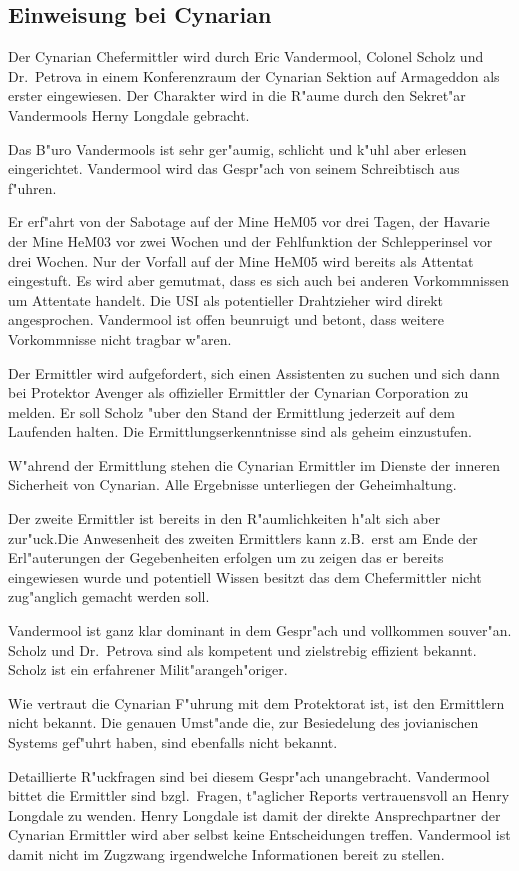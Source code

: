 \subsection{Einweisung bei Cynarian}

Der Cynarian Chefermittler wird durch Eric Vandermool, Colonel Scholz und Dr.~Petrova in einem Konferenzraum der Cynarian Sektion auf Armageddon als erster eingewiesen. Der Charakter wird in die R"aume durch den Sekret"ar Vandermools Herny Longdale gebracht.

Das B"uro Vandermools ist sehr ger"aumig, schlicht und k"uhl aber erlesen eingerichtet. Vandermool wird das Gespr"ach von seinem Schreibtisch aus f"uhren.

Er erf"ahrt von der Sabotage auf der Mine HeM05 vor drei Tagen, der Havarie der Mine HeM03 vor zwei Wochen und der Fehlfunktion der Schlepperinsel vor drei Wochen. Nur der Vorfall auf der Mine HeM05 wird bereits als Attentat eingestuft. Es wird aber gemutma\3t, dass es sich auch bei anderen Vorkommnissen um Attentate handelt. Die USI als potentieller Drahtzieher wird direkt angesprochen. Vandermool ist offen beunruigt und betont, dass weitere Vorkommnisse nicht tragbar w"aren.

Der Ermittler wird aufgefordert, sich einen Assistenten zu suchen und sich dann bei Protektor Avenger als offizieller Ermittler der Cynarian Corporation zu melden. Er soll Scholz "uber den Stand der Ermittlung jederzeit auf dem Laufenden halten. Die Ermittlungserkenntnisse sind als geheim einzustufen.

W"ahrend der Ermittlung stehen die Cynarian Ermittler im Dienste der inneren Sicherheit von Cynarian. Alle Ergebnisse unterliegen der Geheimhaltung.

\begin{remarks}
	Der zweite Ermittler ist bereits in den R"aumlichkeiten h"alt sich aber zur"uck.Die Anwesenheit des zweiten Ermittlers kann z.B.~erst am Ende der Erl"auterungen der Gegebenheiten erfolgen um zu zeigen das er bereits eingewiesen wurde und potentiell Wissen besitzt das dem Chefermittler nicht zug"anglich gemacht werden soll.
	
	Vandermool ist ganz klar dominant in dem Gespr"ach und vollkommen souver"an. Scholz und Dr.~Petrova sind als kompetent und zielstrebig effizient bekannt. Scholz ist ein erfahrener Milit"arangeh"origer.
	
	Wie vertraut die Cynarian F"uhrung mit dem Protektorat ist, ist den Ermittlern nicht bekannt. Die genauen Umst"ande die, zur Besiedelung des jovianischen Systems gef"uhrt haben, sind ebenfalls nicht bekannt.
	
	Detaillierte R"uckfragen sind bei diesem Gespr"ach unangebracht. Vandermool bittet die Ermittler sind bzgl.~Fragen, t"aglicher Reports vertrauensvoll an Henry Longdale zu wenden. Henry Longdale ist damit der direkte Ansprechpartner der Cynarian Ermittler wird aber selbst keine Entscheidungen treffen. Vandermool ist damit nicht im Zugzwang irgendwelche Informationen bereit zu stellen.
\end{remarks}

